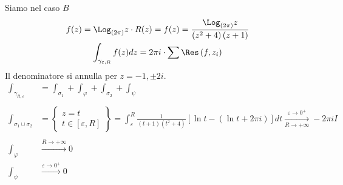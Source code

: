 \Soluzione

Siamo nel caso $B$
\begin{gather*}
f(z) = \Log_{\left(2\pi \right)} z \cdot R(z) = f(z) = \frac{\Log_{\left(2\pi \right)} z}{\left(z^{2} + 4\right)\left(z + 1\right)}\\
\int_{\gamma_{\varepsilon, R}} f(z) dz = 2\pi i \cdot \sum \Res \left(f, z_{i}\right)
\end{gather*}
Il denominatore si annulla per $z = -1, \pm 2i$.
\begin{equation*}
\begin{aligned}
\int_{\gamma_{R, \varepsilon}} & = \int_{\sigma_{1}} + \int_{\varphi} + \int_{\sigma_{2}} + \int_{\psi}\\
 & \\
\int_{\sigma_{1} \cup \sigma_{2}} & = \left\{
\begin{array}{c}
z = t\\
t\in \left[ \varepsilon, R\right]
\end{array}\right\} = \int^{R}_{\varepsilon}\frac{1}{\left(t + 1\right)\left(t^{2} + 4\right)}\left[\ln t - \left(\ln t + 2\pi i\right)\right] dt\xrightarrow[R\rightarrow + \infty ]{\varepsilon \rightarrow 0^{+}} - 2\pi iI\\
 & \\
\int_{\varphi} & \xrightarrow{R\rightarrow + \infty} 0\\
\int_{\psi} & \xrightarrow{\varepsilon \rightarrow 0^{+}} 0
\end{aligned}
\end{equation*}

\Soluzione

